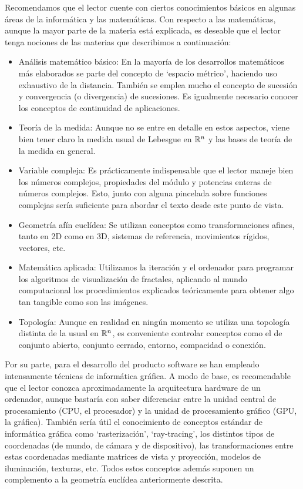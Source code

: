 Recomendamos que el lector cuente con ciertos conocimientos básicos en algunas áreas de la informática y las matemáticas. Con respecto a las matemáticas, aunque la mayor parte de la materia está explicada, es deseable que el lector tenga nociones de las materias que describimos a continuación:

\begin{itemize}
    \item Análisis matemático básico: En la mayoría de los desarrollos matemáticos más elaborados se parte del concepto de `espacio métrico', haciendo uso exhaustivo de la distancia. También se emplea mucho el concepto de sucesión y convergencia (o divergencia) de sucesiones. Es igualmente necesario conocer los conceptos de continuidad de aplicaciones.
    \item Teoría de la medida: Aunque no se entre en detalle en estos aspectos, viene bien tener claro la medida usual de Lebesgue en $\mathbb{R}^n$ y las bases de teoría de la medida en general.
    \item Variable compleja: Es prácticamente indispensable que el lector maneje bien los números complejos, propiedades del módulo y potencias enteras de números complejos. Esto, junto con alguna pincelada sobre funciones complejas sería suficiente para abordar el texto desde este punto de vista.
    \item Geometría afín euclídea: Se utilizan conceptos como transformaciones afines, tanto en 2D como en 3D, sistemas de referencia, movimientos rígidos, vectores, etc.
    \item Matemática aplicada: Utilizamos la iteración y el ordenador para programar los algoritmos de visualización de fractales, aplicando al mundo computacional los procedimientos explicados teóricamente para obtener algo tan tangible como son las imágenes.
    \item Topología: Aunque en realidad en ningún momento se utiliza una topología distinta de la usual en $\mathbb{R}^n$, es conveniente controlar conceptos como el de conjunto abierto, conjunto cerrado, entorno, compacidad o conexión.
\end{itemize}

Por su parte, para el desarrollo del producto software se han empleado intensamente técnicas de informática gráfica. A modo de base, es recomendable que el lector conozca aproximadamente la arquitectura hardware de un ordenador, aunque bastaría con saber diferenciar entre la unidad central de procesamiento (CPU, el procesador) y la unidad de procesamiento gráfico (GPU, la gráfica). También sería útil el conocimiento de conceptos estándar de informática gráfica como `rasterización', `ray-tracing', los distintos tipos de coordenadas (de mundo, de cámara y de dispositivo), las transformaciones entre estas coordenadas mediante matrices de vista y proyección, modelos de iluminación, texturas, etc. Todos estos conceptos además suponen un complemento a la geometría euclídea anteriormente descrita. 

